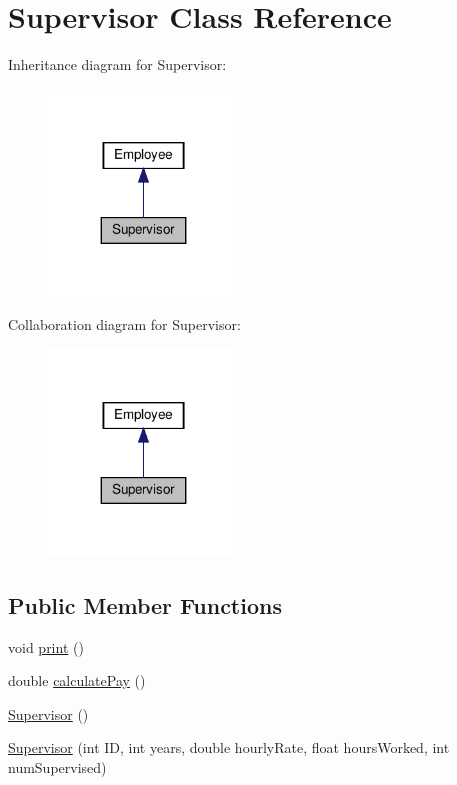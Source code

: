 \hypertarget{classSupervisor}{}\section{Supervisor Class Reference}
\label{classSupervisor}


Inheritance diagram for Supervisor\+:
\nopagebreak
\begin{figure}[H]
\begin{center}
\leavevmode
\includegraphics[width=143pt]{classSupervisor__inherit__graph}
\end{center}
\end{figure}


Collaboration diagram for Supervisor\+:
\nopagebreak
\begin{figure}[H]
\begin{center}
\leavevmode
\includegraphics[width=143pt]{classSupervisor__coll__graph}
\end{center}
\end{figure}
\subsection*{Public Member Functions}
\begin{DoxyCompactItemize}
\item 
void \hyperlink{classSupervisor_a92483dc9a54904d79b46c6ec4efb3f54}{print} ()
\item 
double \hyperlink{classSupervisor_aa37daa89523c08b84ae8141299e036f8}{calculate\+Pay} ()
\item 
\hyperlink{classSupervisor_a9d7eafc36b5429092ba0f758bc7841c4}{Supervisor} ()
\item 
\hyperlink{classSupervisor_a02d9245744652deb20e9408001d6ed3b}{Supervisor} (int ID, int years, double hourly\+Rate, float hours\+Worked, int num\+Supervised)
\end{DoxyCompactItemize}
